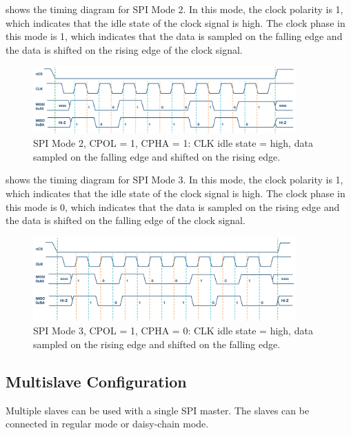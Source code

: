  shows the timing diagram for SPI Mode 2. In this mode, the clock polarity is 1, which indicates that the idle state of the clock signal is high. The clock phase in this mode is 1, which indicates that the data is sampled on the falling edge and the data is shifted on the rising edge of the clock signal.

\begin{figure}[H]
\begin{center}
    \includegraphics[width=0.9\textwidth]{images/SPIMode2.png} 
    \caption{SPI Mode 2, CPOL = 1, CPHA = 1: CLK idle state = high, data sampled on the falling edge and shifted on the rising edge.}
    \label{SPIMode2}
\end{center}
\end{figure}

 shows the timing diagram for SPI Mode 3. In this mode, the clock polarity is 1, which indicates that the idle state of the clock signal is high. The clock phase in this mode is 0, which indicates that the data is sampled on the rising edge and the data is shifted on the falling edge of the clock signal.

\begin{figure}[H]
\begin{center}
    \includegraphics[width=0.9\textwidth]{images/SPIMode3.png} 
    \caption{SPI Mode 3, CPOL = 1, CPHA = 0: CLK idle state = high, data sampled on the rising edge and shifted on the falling edge.}
    \label{SPIMode3}
\end{center}
\end{figure}

\subsection{Multislave Configuration}
Multiple slaves can be used with a single SPI master. The slaves can be connected in regular mode or daisy-chain mode.

